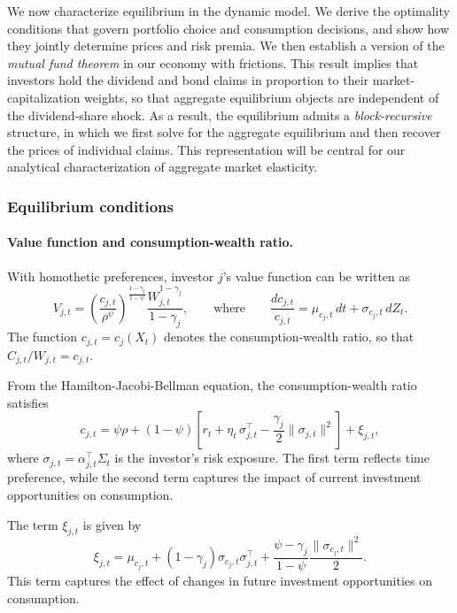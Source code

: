 \documentclass[12pt,english]{article}
\begin{document}
We now characterize equilibrium in the dynamic model.
We derive the optimality conditions that govern portfolio choice and consumption decisions, and show how they jointly determine prices and risk premia.
We then establish a version of the \textit{mutual fund theorem} in our economy with frictions.
This result implies that investors hold the dividend and bond claims in proportion to their market-capitalization weights, so that aggregate equilibrium objects are independent of the dividend-share shock.
As a result, the equilibrium admits a \textit{block-recursive} structure, in which we first solve for the aggregate equilibrium and then recover the prices of individual claims.
This representation will be central for our analytical characterization of aggregate market elasticity.

\subsubsection{Equilibrium conditions}

\paragraph{Value function and consumption-wealth ratio.}

With homothetic preferences, investor $j$'s value function can be written as
\begin{equation}
    V_{j,t} = \left( \frac{c_{j,t}}{\rho^\psi} \right)^{\frac{1-\gamma_j}{1-\psi}} 
    \frac{W_{j,t}^{1-\gamma_j}}{1-\gamma_j},
    \qquad
    \text{where} \qquad 
    \frac{dc_{j,t}}{c_{j,t}} = \mu_{c_j,t}\, dt + \sigma_{c_j,t}\, dZ_t.
\end{equation}
The function $c_{j,t} = c_j(X_t)$ denotes the consumption-wealth ratio, so that $C_{j,t}/W_{j,t} = c_{j,t}$.

From the Hamilton-Jacobi-Bellman equation, the consumption-wealth ratio satisfies
\begin{equation}\label{eq:HJB_complete}
    c_{j,t} = \psi \rho 
    + (1-\psi) \left[ r_t + \eta_{t} \,\sigma_{j,t}^\top - \frac{\gamma_j}{2} \|\sigma_{j,t}\|^2 \right] 
    + \xi_{j,t},
\end{equation}
where $\sigma_{j,t} = \alpha_{j,t}^\top \Sigma_t$ is the investor's risk exposure.
The first term reflects time preference, while the second term captures the impact of current investment opportunities on consumption.

The term $\xi_{j,t}$ is given by
\[
    \xi_{j,t} = \mu_{c_j,t} 
    + (1-\gamma_j) \sigma_{c_j,t} \sigma_{j,t}^\top 
    + \frac{\psi - \gamma_j}{1-\psi} \frac{\|\sigma_{c_j,t}\|^2}{2}.
\]
This term captures the effect of changes in future investment opportunities on consumption.
\end{document}
